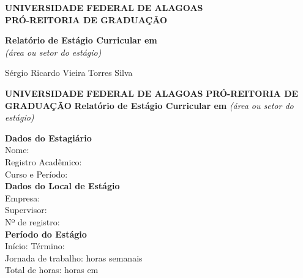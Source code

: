 \documentclass[12pt,a4paper]{article}
\begin{document}
	
	\begin{titlepage}
		\centering
		\large
		\textbf{UNIVERSIDADE FEDERAL DE ALAGOAS} \\
		\textbf{PRÓ-REITORIA DE GRADUAÇÃO} \\
		\vfill
		
		\Huge \textbf{Relatório de Estágio Curricular em} \\
		\vspace{0.5cm}
		\LARGE \textit{(área ou setor do estágio)} \\
		\vfill
		
		\Large Sérgio Ricardo Vieira Torres Silva \\
		\vspace{1.5cm}
	\end{titlepage}
	
	\thispagestyle{empty}
	\begin{center}
		\textbf{UNIVERSIDADE FEDERAL DE ALAGOAS} 
		\textbf{PRÓ-REITORIA DE GRADUAÇÃO} 
		\vspace{1cm}
		\textbf{Relatório de Estágio Curricular em} 
		\textit{(área ou setor do estágio)}
	\end{center}
	
	\vspace{1cm}
	
	\noindent \textbf{Dados do Estagiário} \\
	Nome: \underline{\hspace{12cm}} \\
	Registro Acadêmico: \underline{\hspace{10cm}} \\
	Curso e Período: \underline{\hspace{10cm}} \\
	
	\vspace{0.5cm}
	\noindent \textbf{Dados do Local de Estágio} \\
	Empresa: \underline{\hspace{13cm}} \\
	Supervisor: \underline{\hspace{12cm}} \\
	Nº de registro: \underline{\hspace{10cm}} \\
	
	\vspace{0.5cm}
	\noindent \textbf{Período do Estágio} \\
	Início: \underline{\hspace{4cm}} \quad Término: \underline{\hspace{4cm}} \\
	Jornada de trabalho: \underline{\hspace{5cm}} horas semanais \\
	Total de horas: \underline{\hspace{4cm}} horas em \underline{\hspace{6cm}} \\
	
\end{document}
